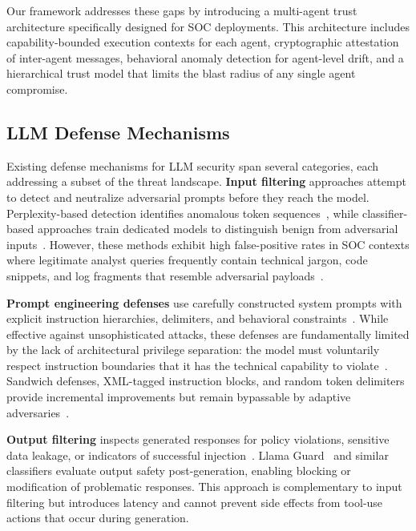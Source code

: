 \documentclass[journal,twoside]{IEEEtran}
\begin{document}
Our framework addresses these gaps by introducing a multi-agent trust architecture specifically designed for SOC deployments. This architecture includes capability-bounded execution contexts for each agent, cryptographic attestation of inter-agent messages, behavioral anomaly detection for agent-level drift, and a hierarchical trust model that limits the blast radius of any single agent compromise.

\subsection{LLM Defense Mechanisms}
\label{sec:bg_defenses}

Existing defense mechanisms for LLM security span several categories, each addressing a subset of the threat landscape. \textbf{Input filtering} approaches attempt to detect and neutralize adversarial prompts before they reach the model. Perplexity-based detection identifies anomalous token sequences~\cite{jain2023baseline}, while classifier-based approaches train dedicated models to distinguish benign from adversarial inputs~\cite{alon2023detecting}. However, these methods exhibit high false-positive rates in SOC contexts where legitimate analyst queries frequently contain technical jargon, code snippets, and log fragments that resemble adversarial payloads~\cite{liu2024formalizing}.

\textbf{Prompt engineering defenses} use carefully constructed system prompts with explicit instruction hierarchies, delimiters, and behavioral constraints~\cite{openai2024system}. While effective against unsophisticated attacks, these defenses are fundamentally limited by the lack of architectural privilege separation: the model must voluntarily respect instruction boundaries that it has the technical capability to violate~\cite{wei2024jailbroken}. Sandwich defenses, XML-tagged instruction blocks, and random token delimiters provide incremental improvements but remain bypassable by adaptive adversaries~\cite{yi2024jailbreak}.

\textbf{Output filtering} inspects generated responses for policy violations, sensitive data leakage, or indicators of successful injection~\cite{inan2023llama}. Llama Guard~\cite{inan2023llama} and similar classifiers evaluate output safety post-generation, enabling blocking or modification of problematic responses. This approach is complementary to input filtering but introduces latency and cannot prevent side effects from tool-use actions that occur during generation.
\end{document}
